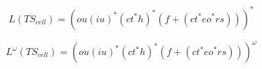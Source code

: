 \[L(TS_{cell})=\left( ou(iu)^*(ct^*h)^*(f + (ct^*eo^*rs))\right)^* \]

\[ L^\omega(TS_{cell})=\left( ou(iu)^*(ct^*h)^*(f + (ct^*eo^*rs))\right)^\omega\]


